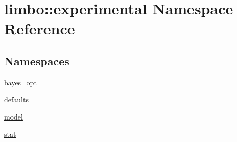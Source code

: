 \hypertarget{namespacelimbo_1_1experimental}{}\section{limbo\+:\+:experimental Namespace Reference}
\label{namespacelimbo_1_1experimental}
\subsection*{Namespaces}
\begin{DoxyCompactItemize}
\item 
 \hyperlink{namespacelimbo_1_1experimental_1_1bayes__opt}{bayes\+\_\+opt}
\item 
 \hyperlink{namespacelimbo_1_1experimental_1_1defaults}{defaults}
\item 
 \hyperlink{namespacelimbo_1_1experimental_1_1model}{model}
\item 
 \hyperlink{namespacelimbo_1_1experimental_1_1stat}{stat}
\end{DoxyCompactItemize}

